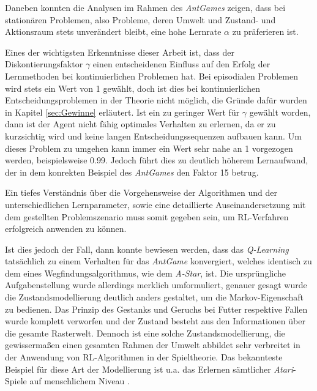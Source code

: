 \par 
Daneben konnten die Analysen im Rahmen des \textit{AntGames} zeigen, dass bei stationären Problemen, also Probleme, deren Umwelt und Zustand- und Aktionsraum stets unverändert bleibt, eine hohe Lernrate $\alpha$ zu präferieren ist.
\par 
Eines der wichtigsten Erkenntnisse dieser Arbeit ist, dass der Diskontierungsfaktor $\gamma$ einen entscheidenen Einfluss auf den Erfolg der Lernmethoden bei kontinuierlichen Problemen hat. Bei episodialen Problemen wird stets ein Wert von 1 gewählt, doch ist dies bei kontinuierlichen Entscheidungsproblemen in der Theorie nicht möglich, die Gründe dafür wurden in Kapitel \ref{sec:Gewinne} erläutert. Ist ein zu geringer Wert für $\gamma$ gewählt worden, dann ist der Agent nicht fähig optimales Verhalten zu erlernen, da er zu \glqq kurzsichtig\grqq{} wird und keine langen Entscheidungssequenzen aufbauen kann. Um dieses Problem zu umgehen kann immer ein Wert sehr nahe an 1 vorgezogen werden, beispielsweise 0.99. Jedoch führt dies zu deutlich höherem Lernaufwand, der in dem konrekten Beispiel des \textit{AntGames} den Faktor 15 betrug.
\par
Ein tiefes Verständnis über die Vorgehensweise der Algorithmen und der unterschiedlichen Lernparameter, sowie eine detaillierte Auseinandersetzung mit dem gestellten Problemszenario muss somit gegeben sein, um RL-Verfahren erfolgreich anwenden zu können.
\par 
Ist dies jedoch der Fall, dann konnte bewiesen werden, dass das \textit{Q-Learning} tatsächlich zu einem Verhalten für das \textit{AntGame} konvergiert, welches identisch zu dem eines Wegfindungsalgorithmus, wie dem \textit{A-Star}, ist. Die ursprüngliche Aufgabenstellung wurde allerdings merklich umformuliert, genauer gesagt wurde die Zustandsmodellierung deutlich anders gestaltet, um die Markov-Eigenschaft zu bedienen. Das Prinzip des Gestanks und Geruchs bei Futter respektive Fallen wurde komplett verworfen und der Zustand besteht aus  den Informationen über die gesamte Rasterwelt. Dennoch ist eine solche Zustandsmodellierung, die gewissermaßen einen gesamten Rahmen der Umwelt abbildet sehr verbreitet in der Anwendung von RL-Algorithmen in der Spieltheorie. Das bekannteste Beispiel für diese Art der Modellierung ist u.a. das Erlernen sämtlicher \textit{Atari}-Spiele auf menschlichem Niveau \cite{dqn}.
\par 
